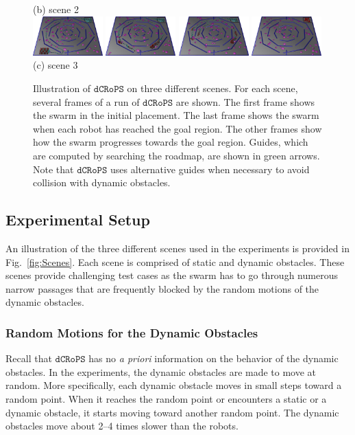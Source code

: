 \documentclass[letterpaper, 10pt, conference]{ieeeconf}
\newcommand{\Acronym}[1]{\ensuremath{{{\texttt{#1}}}}}
\newcommand{\Name}{\Acronym{dCRoPS}}
\begin{document}
\begin{figure}
(b) scene 2\\[2mm]
\includegraphics[width=0.24\textwidth]{usef/figC_Inter1_scaled.jpg}
\includegraphics[width=0.24\textwidth]{usef/figC_Inter2_scaled.jpg}
\includegraphics[width=0.24\textwidth]{usef/figC_Inter3_scaled.jpg}
\includegraphics[width=0.24\textwidth]{usef/figC_Inter4_scaled.jpg}\\[2mm]
(c) scene 3
\caption{Illustration of $\Name$ on three different scenes. For each
  scene, several frames of a run of $\Name$ are shown. The first frame shows the
  swarm in the initial placement. The last frame shows the swarm when
  each robot has reached the goal region. The other frames show how the
  swarm progresses towards the goal region. Guides, which are computed
  by searching the roadmap, are shown in green arrows. Note that
  $\Name$ uses alternative guides when necessary to avoid collision with
  dynamic obstacles.}
\label{fig:ResQual}
\end{figure}


\subsection{Experimental Setup}

An illustration of the three different scenes used in the experiments
is provided in Fig.~\ref{fig:Scenes}. Each scene is comprised of
static and dynamic obstacles. These scenes provide challenging test
cases as the swarm has to go through numerous narrow passages that are
frequently blocked by the random motions of the dynamic obstacles.


\subsubsection{Random Motions for the Dynamic Obstacles} Recall that $\Name$
has no \emph{a priori} information on the behavior of the dynamic obstacles. In
the experiments, the dynamic obstacles are made to move at random. More
specifically, each dynamic obstacle moves in small steps toward a random point.
When it reaches the random point or encounters a static or a dynamic obstacle,
it starts moving toward another random point. The dynamic obstacles move about
2--4 times slower than the robots.
\end{document}

